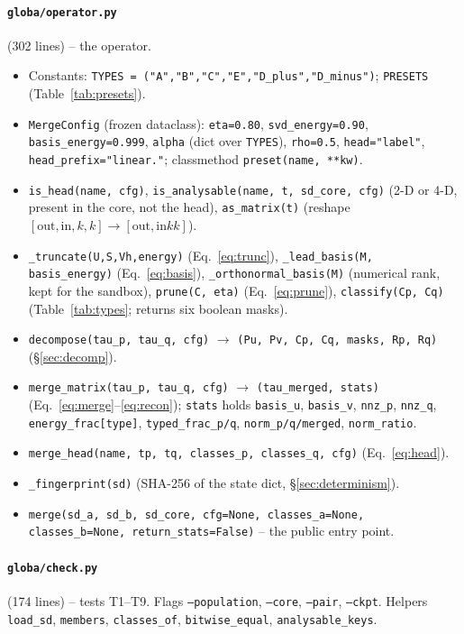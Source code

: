 \documentclass[11pt,a4paper]{article}
\newcommand{\code}[1]{\texttt{#1}}
\begin{document}
\paragraph{\code{globa/operator.py}} (302 lines) -- the operator.
\begin{itemize}[nosep]
\item Constants: \code{TYPES = ("A","B","C","E","D\_plus","D\_minus")}; \code{PRESETS} (Table~\ref{tab:presets}).
\item \code{MergeConfig} (frozen dataclass): \code{eta=0.80}, \code{svd\_energy=0.90}, \code{basis\_energy=0.999}, \code{alpha} (dict over \code{TYPES}), \code{rho=0.5}, \code{head="label"}, \code{head\_prefix="linear."}; classmethod \code{preset(name, **kw)}.
\item \code{is\_head(name, cfg)}, \code{is\_analysable(name, t, sd\_core, cfg)} (2-D or 4-D, present in the core, not the head), \code{as\_matrix(t)} (reshape $[\mathrm{out},\mathrm{in},k,k]\to[\mathrm{out},\mathrm{in}kk]$).
\item \code{\_truncate(U,S,Vh,energy)} (Eq.~\ref{eq:trunc}), \code{\_lead\_basis(M, basis\_energy)} (Eq.~\ref{eq:basis}), \code{\_orthonormal\_basis(M)} (numerical rank, kept for the sandbox), \code{prune(C, eta)} (Eq.~\ref{eq:prune}), \code{classify(Cp, Cq)} (Table~\ref{tab:types}; returns six boolean masks).
\item \code{decompose(tau\_p, tau\_q, cfg)} $\to$ \code{(Pu, Pv, Cp, Cq, masks, Rp, Rq)} (\S\ref{sec:decomp}).
\item \code{merge\_matrix(tau\_p, tau\_q, cfg)} $\to$ \code{(tau\_merged, stats)} (Eq.~\ref{eq:merge}--\ref{eq:recon}); \code{stats} holds \code{basis\_u}, \code{basis\_v}, \code{nnz\_p}, \code{nnz\_q}, \code{energy\_frac[type]}, \code{typed\_frac\_p/q}, \code{norm\_p/q/merged}, \code{norm\_ratio}.
\item \code{merge\_head(name, tp, tq, classes\_p, classes\_q, cfg)} (Eq.~\ref{eq:head}).
\item \code{\_fingerprint(sd)} (SHA-256 of the state dict, \S\ref{sec:determinism}).
\item \code{merge(sd\_a, sd\_b, sd\_core, cfg=None, classes\_a=None, classes\_b=None, return\_stats=False)} -- the public entry point.
\end{itemize}

\paragraph{\code{globa/check.py}} (174 lines) -- tests T1--T9. Flags \code{--population}, \code{--core}, \code{--pair}, \code{--ckpt}. Helpers \code{load\_sd}, \code{members}, \code{classes\_of}, \code{bitwise\_equal}, \code{analysable\_keys}.
\end{document}
